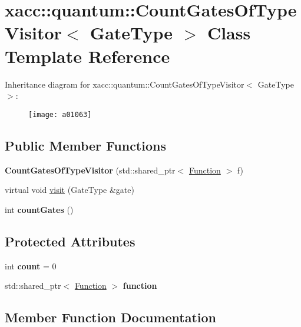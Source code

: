 \hypertarget{a01063}{}\section{xacc\+:\+:quantum\+:\+:Count\+Gates\+Of\+Type\+Visitor$<$ Gate\+Type $>$ Class Template Reference}
\label{a01063}
Inheritance diagram for xacc\+:\+:quantum\+:\+:Count\+Gates\+Of\+Type\+Visitor$<$ Gate\+Type $>$\+:\begin{figure}[H]
\begin{center}
\leavevmode
\texttt{[image: a01063]}
\end{center}
\end{figure}
\subsection*{Public Member Functions}
\begin{DoxyCompactItemize}
\item 
\mbox{\label{a01063_a4c2507e3ee4fe51e7ff4501bf5569cfc}} 
{\bfseries Count\+Gates\+Of\+Type\+Visitor} (std\+::shared\+\_\+ptr$<$ \hyperlink{a01127}{Function} $>$ f)
\item 
virtual void \hyperlink{a01063_a9c40e6cb4b74e2d6714c531ffc3b2909}{visit} (Gate\+Type \&gate)
\item 
\mbox{\label{a01063_a8a1a17ed50cd6727c2eb07976f886389}} 
int {\bfseries count\+Gates} ()
\end{DoxyCompactItemize}
\subsection*{Protected Attributes}
\begin{DoxyCompactItemize}
\item 
\mbox{\label{a01063_ae3d8ae4c40c1552ee68aa6e5002e42bd}} 
int {\bfseries count} = 0
\item 
\mbox{\label{a01063_a202ab6e0e365af735da706fe972333e7}} 
std\+::shared\+\_\+ptr$<$ \hyperlink{a01127}{Function} $>$ {\bfseries function}
\end{DoxyCompactItemize}


\subsection{Member Function Documentation}
\mbox{\label{a01063_a9c40e6cb4b74e2d6714c531ffc3b2909}} 
